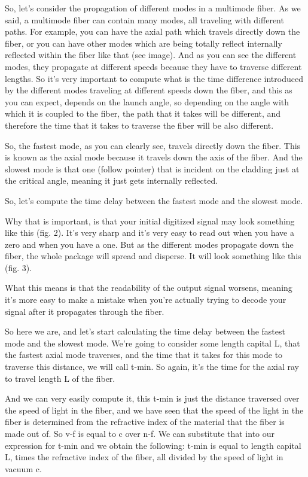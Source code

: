So, let's consider the propagation of different modes in a multimode fiber. As we said, a multimode fiber can contain many modes, all traveling with different paths. For example, you can have the axial path which travels directly down the fiber, or you can have other modes which are being totally reflect internally reflected within the fiber like that (see image). And as you can see the different modes, they propagate at different speeds because they have to traverse different lengths. So it's very important to compute what is the time difference introduced by the different modes traveling at different speeds down the fiber, and this as you can expect, depends on the launch angle, so depending on the angle with which it is coupled to the fiber, the path that it takes will be different, and therefore the time that it takes to traverse the fiber will be also different.

So, the fastest mode, as you can clearly see, travels directly down the fiber. This is known as the axial mode because it travels down the axis of the fiber. And the slowest mode is that one (follow pointer) that is incident on the cladding just at the critical angle, meaning it just gets internally reflected.

So, let's compute the time delay between the fastest mode and the slowest mode.

Why that is important, is that your initial digitized signal may look something like this (fig. 2). It's very sharp and it's very easy to read out when you have a zero and when you have a one. But as the different modes propagate down the fiber, the whole package will spread and disperse. It will look something like this (fig. 3).

What this means is that the readability of the output signal worsens, meaning it's more easy to make a mistake when you're actually trying to decode your signal after it propagates through the fiber.

So here we are, and let's start calculating the time delay between the fastest mode and the slowest mode. We're going to consider some length capital L, that the fastest axial mode traverses, and the time that it takes for this mode to traverse this distance, we will call t-min. So again, it's the time for the axial ray to travel length L of the fiber.

And we can very easily compute it, this t-min is just the distance traversed over the speed of light in the fiber, and we have seen that the speed of the light in the fiber is determined from the refractive index of the material that the fiber is made out of. So v-f is equal to c over n-f. We can substitute that into our expression for t-min and we obtain the following: t-min is equal to length capital L, times the refractive index of the fiber, all divided by the speed of light in vacuum c.

